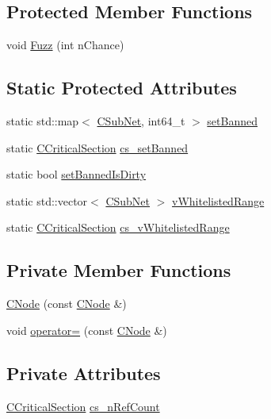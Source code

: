 \subsection*{Protected Member Functions}
\begin{DoxyCompactItemize}
\item 
void \mbox{\hyperlink{class_c_node_a39512c4e2c788fb7a09e629b79a69e47}{Fuzz}} (int n\+Chance)
\end{DoxyCompactItemize}
\subsection*{Static Protected Attributes}
\begin{DoxyCompactItemize}
\item 
static std\+::map$<$ \mbox{\hyperlink{class_c_sub_net}{C\+Sub\+Net}}, int64\+\_\+t $>$ \mbox{\hyperlink{class_c_node_a8f8bfe073dc98f0facd20969cf31add1}{set\+Banned}}
\item 
static \mbox{\hyperlink{sync_8h_a37a4692b2d517f2843655ca11af7668a}{C\+Critical\+Section}} \mbox{\hyperlink{class_c_node_a9ff9a6f07a280aa07d77713ae43d383a}{cs\+\_\+set\+Banned}}
\item 
static bool \mbox{\hyperlink{class_c_node_af9a307a7a95d50c600301ed506204794}{set\+Banned\+Is\+Dirty}}
\item 
static std\+::vector$<$ \mbox{\hyperlink{class_c_sub_net}{C\+Sub\+Net}} $>$ \mbox{\hyperlink{class_c_node_afaac354c1226990e4e9407ba2ee4cbf9}{v\+Whitelisted\+Range}}
\item 
static \mbox{\hyperlink{sync_8h_a37a4692b2d517f2843655ca11af7668a}{C\+Critical\+Section}} \mbox{\hyperlink{class_c_node_a4a79c02f5024b57ca9e6a1f8d103f363}{cs\+\_\+v\+Whitelisted\+Range}}
\end{DoxyCompactItemize}
\subsection*{Private Member Functions}
\begin{DoxyCompactItemize}
\item 
\mbox{\hyperlink{class_c_node_abd071f2747ad0e0e693df1828e9b8ea3}{C\+Node}} (const \mbox{\hyperlink{class_c_node}{C\+Node}} \&)
\item 
void \mbox{\hyperlink{class_c_node_a91d186dc3a8a8f45ddd1ac2cc96dc803}{operator=}} (const \mbox{\hyperlink{class_c_node}{C\+Node}} \&)
\end{DoxyCompactItemize}
\subsection*{Private Attributes}
\begin{DoxyCompactItemize}
\item 
\mbox{\hyperlink{sync_8h_a37a4692b2d517f2843655ca11af7668a}{C\+Critical\+Section}} \mbox{\hyperlink{class_c_node_a03946197bacd9b1fe2b698bd85b18dd3}{cs\+\_\+n\+Ref\+Count}}
\end{DoxyCompactItemize}
